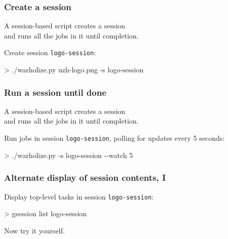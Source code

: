 \documentclass[english,serif,mathserif,usenames,dvipsnames]{beamer}
\begin{document}



\begin{frame}
  \frametitle{Create a session}

  A session-based script \alert{creates a session}
  \\
  and runs all the jobs in it until completion.

  \+ Create session \texttt{logo-session}:
\begin{semiverbatim}
    > ./warholize.py uzh-logo.png -s logo-session
\end{semiverbatim}
\end{frame}


\begin{frame}
  \frametitle{Run a session until done}

  A session-based script creates a session
  \\
  and \alert{runs all the jobs in it until completion.}

  \+ Run jobs in session \texttt{logo-session},
  polling for updates every 5 seconds:
\begin{semiverbatim}
    > ./warholize.py -s logo-session -{}-watch 5
\end{semiverbatim}

  \+ 
\end{frame}


\begin{frame}
  \frametitle{Alternate display of session contents, I}

  Display top-level tasks in session \texttt{logo-session}:
\begin{semiverbatim}
    > gsession list logo-session
\end{semiverbatim}

  \begin{exercise*}
    Now try it yourself.
  \end{exercise*}
\end{frame}
\end{document}
